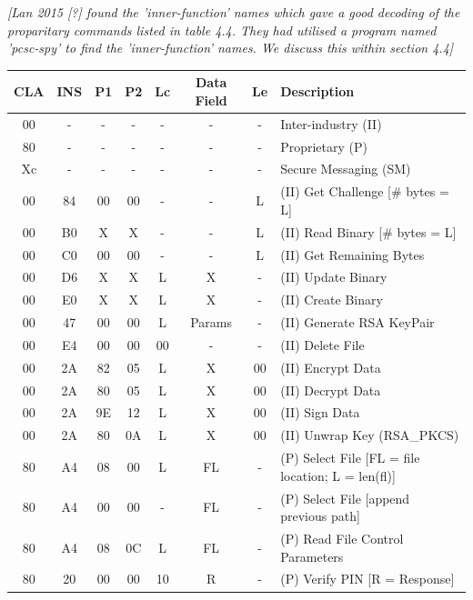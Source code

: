 \documentclass[bsc,frontabs,twoside,singlespacing,parskip,deptreport]{infthesis}     %
\begin{document}
\textit{[Lan 2015 [?] found the 'inner-function' names which gave a good decoding of the proparitary commands listed in table 4.4. They had utilised a program named 'pcsc-spy' to find the 'inner-function' names. We discuss this within section 4.4]}

\begin{table}[H]
\hskip-1.0cm\begin{tabular}{|c|c|c|c|c|c|c|p{8cm}|}
\hline
CLA & INS & P1 & P2 & Lc  & Data Field & Le & Description\\
\hline
00  & -   & -  & -  & -   & -          & -  & Inter-industry (II)\\
80  & -   & -  & -  & -   & -          & -  & Proprietary (P)\\
Xc  & -   & -  & -  & -   & -          & -  & Secure Messaging (SM)\\
\hline
00  & 84  & 00 & 00 & -   & -          & L  &  (II) Get Challenge [\# bytes = L]\\
00  & B0  & X  & X  & -   & -          & L  &  (II) Read Binary [\# bytes = L] \\
00  & C0  & 00 & 00 & -   & -          & L  &  (II) Get Remaining Bytes\\
00  & D6  & X  & X  & L   & X          & -  &  (II) Update Binary\\
00  & E0  & X  & X  & L   & X          & -  &  (II) Create Binary\\
00  & 47  & 00 & 00 & L   & Params     & -  &  (II) Generate RSA KeyPair\\
00  & E4  & 00 & 00 & 00  & -          & -  &  (II) Delete File\\
00  & 2A  & 82 & 05 & L   & X          & 00 &  (II) Encrypt Data \\
00  & 2A  & 80 & 05 & L   & X          & 00 &  (II) Decrypt Data \\
00  & 2A  & 9E & 12 & L   & X          & 00 &  (II) Sign Data \\
00  & 2A  & 80 & 0A & L   & X          & 00  & (II) Unwrap Key (RSA\_PKCS)\\
\hline
80  & A4  & 08 & 00 & L   & FL         & -  & (P) Select File [FL = file location; L = len(fl)]\\
80  & A4  & 00 & 00 & -   & FL         & -  & (P) Select File [append previous path]\\
80  & A4  & 08 & 0C & L   & FL         & -  & (P) Read File Control Parameters\\
80  & 20  & 00 & 00 & 10  & R          & -  & (P) Verify PIN [R = Response]\\

\end{tabular}
\end{table}
\end{document}
